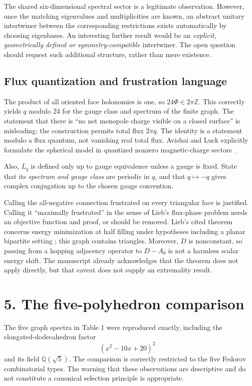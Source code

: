 \documentclass[11pt,a4paper]{article}
\newcommand{\Q}{\mathbb Q}
\begin{document}
The shared six-dimensional spectral sector is a legitimate observation. However, once the matching eigenvalues and multiplicities are known, an abstract unitary intertwiner between the corresponding restrictions exists automatically by choosing eigenbases. An interesting further result would be an \emph{explicit, geometrically defined or symmetry-compatible} intertwiner. The open question should request such additional structure, rather than mere existence.

\subsection*{Flux quantization and frustration language}
The product of all oriented face holonomies is one, so $24\Phi\in2\pi\mathbb Z$. This correctly yields $q$ modulo 24 for the gauge class and spectrum of the finite graph. The statement that there is ``no net monopole charge visible on a closed surface'' is misleading: the construction permits total flux $2\pi q$. The identity is a statement modulo a flux quantum, not vanishing real total flux. Avishai and Luck explicitly formulate the spherical model in quantized nonzero magnetic-charge sectors \cite{al}.

Also, $L_q$ is defined only up to gauge equivalence unless a gauge is fixed. State that its \emph{spectrum and gauge class} are periodic in $q$, and that $q\mapsto -q$ gives complex conjugation up to the chosen gauge convention.

Calling the all-negative connection frustrated on every triangular face is justified. Calling it ``maximally frustrated'' in the sense of Lieb's flux-phase problem needs an objective function and proof, or should be removed. Lieb's cited theorem concerns energy minimization at half filling under hypotheses including a planar bipartite setting \cite{lieb}; this graph contains triangles. Moreover, $D$ is nonconstant, so passing from a hopping adjacency operator to $D-A_\theta$ is not a harmless scalar energy shift. The manuscript already acknowledges that the theorem does not apply directly, but that caveat does not supply an extremality result.

\section*{5. The five-polyhedron comparison}
The five graph spectra in Table 1 were reproduced exactly, including the elongated-dodecahedron factor
\[
 (x^2-10x+20)^2
\]
and its field $\Q(\sqrt5)$. The comparison is correctly restricted to the five Fedorov combinatorial types. The warning that these observations are descriptive and do not constitute a canonical selection principle is appropriate.
\end{document}
